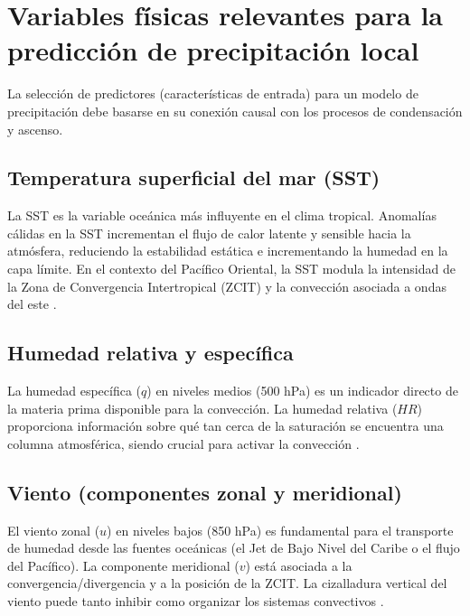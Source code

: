 \section{Variables físicas relevantes para la predicción de precipitación local}

La selección de predictores (características de entrada) para un modelo de precipitación debe basarse en su conexión causal con los procesos de condensación y ascenso.

\subsection{Temperatura superficial del mar (SST)}
La SST es la variable oceánica más influyente en el clima tropical. Anomalías cálidas en la SST incrementan el flujo de calor latente y sensible hacia la atmósfera, reduciendo la estabilidad estática e incrementando la humedad en la capa límite. En el contexto del Pacífico Oriental, la SST modula la intensidad de la Zona de Convergencia Intertropical (ZCIT) y la convección asociada a ondas del este \citep{iglesias2010temperatura, cabos2002influencia, neelin1998enso}.

\subsection{Humedad relativa y específica}
La humedad específica (\(q\)) en niveles medios (500 hPa) es un indicador directo de la materia prima disponible para la convección. La humedad relativa (\(HR\)) proporciona información sobre qué tan cerca de la saturación se encuentra una columna atmosférica, siendo crucial para activar la convección \citep{pierrehumbert2007relative, peixoto1996climatology, trenberth2003changing, frei1998heavy}. 

\subsection{Viento (componentes zonal y meridional)}
El viento zonal (\(u\)) en niveles bajos (850 hPa) es fundamental para el transporte de humedad desde las fuentes oceánicas (el Jet de Bajo Nivel del Caribe o el flujo del Pacífico). La componente meridional (\(v\)) está asociada a la convergencia/divergencia y a la posición de la ZCIT. La cizalladura vertical del viento puede tanto inhibir como organizar los sistemas convectivos \citep{houze2014cloud, yim2014comparison, sodemann2013moisture, duran2010revision, raymond2006dynamics}.

